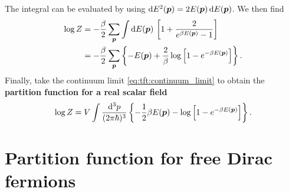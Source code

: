 The integral can be evaluated by using $\mathop{}\!\mathrm{d} E^2({\bm{p}}) = 2 E({\bm{p}}) \mathop{}\!\mathrm{d} E({\bm{p}})$.
We then find
\begin{equation}
\begin{split}
	\log Z &= -\frac{\beta}{2} \sum_{\bm{p}} \int \mathop{}\!\mathrm{d} E  ({\bm{p}}) \, \left[ 1 + \frac{2}{e^{\beta E({\bm{p}})} - 1} \right] \\
	       &= -\frac{\beta}{2} \sum_{\bm{p}} \left\{ -E({\bm{p}}) + \frac{2}{\beta} \log \left[ 1 - e^{-\beta E({\bm{p}})} \right] \right\} .
\end{split}
\end{equation}
Finally, take the continuum limit \eqref{eq:tft:continuum_limit} to obtain the \textbf{partition function for a real scalar field}
\begin{equation}
	\log Z = V \int \frac{\mathop{}\!\mathrm{d}^3 p}{(2 \pi \hbar)^3} \left\{ -\frac12 \beta E({\bm{p}}) - \log \left[ 1 - e^{-\beta E({\bm{p}})} \right] \right\} .
\label{eq:tft:real_scalar_field_partition_function}
\end{equation}

\section{Partition function for free Dirac fermions}


